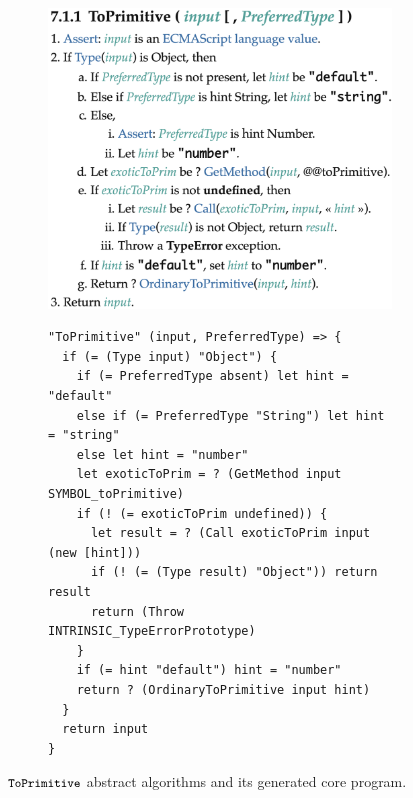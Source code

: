 \begin{figure}[t]
  \centering
  \begin{subfigure}{0.4\textwidth}
    \includegraphics[width=\textwidth]{img/to_primitive.png}
    \label{fig:to-primitive-es}
  \end{subfigure}
  \qquad
  \begin{subfigure}{0.48\textwidth}
    \begin{lstlisting}[style=ires]
"ToPrimitive" (input, PreferredType) => {
  if (= (Type input) "Object") {
    if (= PreferredType absent) let hint = "default"
    else if (= PreferredType "String") let hint = "string"
    else let hint = "number"
    let exoticToPrim = ? (GetMethod input SYMBOL_toPrimitive)
    if (! (= exoticToPrim undefined)) {
      let result = ? (Call exoticToPrim input (new [hint]))
      if (! (= (Type result) "Object")) return result
      return (Throw INTRINSIC_TypeErrorPrototype)
    }
    if (= hint "default") hint = "number"
    return ? (OrdinaryToPrimitive input hint)
  }
  return input
}
    \end{lstlisting}
    \label{fig:to-primitive-ires}
  \end{subfigure}
  \caption{\( \texttt{\small ToPrimitive} \) abstract algorithms
  and its generated core program.}
  \label{fig:to-primitive}
\end{figure}

